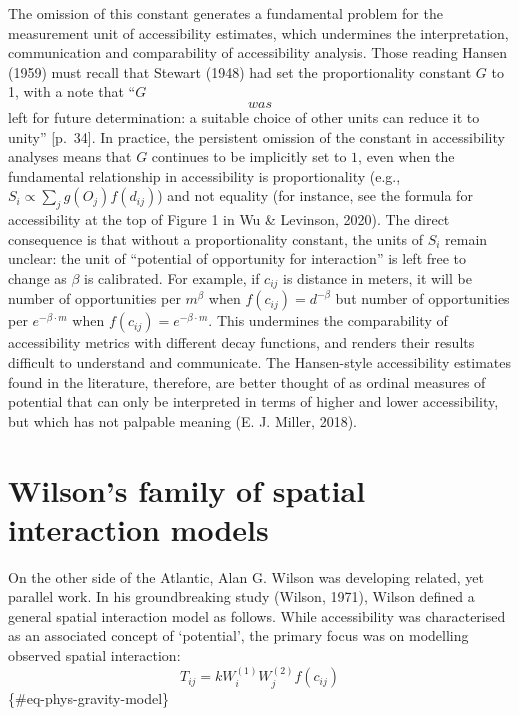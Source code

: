 \documentclass[
11pt, %
oneside, %
english, %
singlespacing, %
]{macthesis} %
\begin{document}
The omission of this constant generates a fundamental problem for the measurement unit of accessibility estimates, which undermines the interpretation, communication and comparability of accessibility analysis. Those reading Hansen (1959) must recall that Stewart (1948) had set the proportionality constant \(G\) to 1, with a note that ``\(G\) \[was\] left for future determination: a suitable choice of other units can reduce it to unity'' {[}p.~34{]}. In practice, the persistent omission of the constant in accessibility analyses means that \(G\) continues to be implicitly set to \(1\), even when the fundamental relationship in accessibility is proportionality (e.g., \(S_{i} \propto \sum_j g(O_j)f(d_{ij})\)) and not equality (for instance, see the formula for accessibility at the top of Figure 1 in Wu \& Levinson, 2020). The direct consequence is that without a proportionality constant, the units of \(S_i\) remain unclear: the unit of ``potential of opportunity for interaction'' is left free to change as \(\beta\) is calibrated. For example, if \(c_{ij}\) is distance in meters, it will be number of opportunities per \(m^{\beta}\) when \(f(c_{ij}) = d^{-\beta}\) but number of opportunities per \(e^{-\beta\cdot m}\) when \(f(c_{ij}) = e^{-\beta\cdot m}\). This undermines the comparability of accessibility metrics with different decay functions, and renders their results difficult to understand and communicate. The Hansen-style accessibility estimates found in the literature, therefore, are better thought of as ordinal measures of potential that can only be interpreted in terms of higher and lower accessibility, but which has not palpable meaning (E. J. Miller, 2018).

\section{Wilson's family of spatial interaction models}\label{wilsons-family-of-spatial-interaction-models}

On the other side of the Atlantic, Alan G. Wilson was developing related, yet parallel work. In his groundbreaking study (Wilson, 1971), Wilson defined a general spatial interaction model as follows. While accessibility was characterised as an associated concept of `potential', the primary focus was on modelling observed spatial interaction:
\[
T_{ij} = k W_i^{(1)} W_j^{(2)} f(c_{ij})
\] \{\#eq-phys-gravity-model\}
\end{document}
